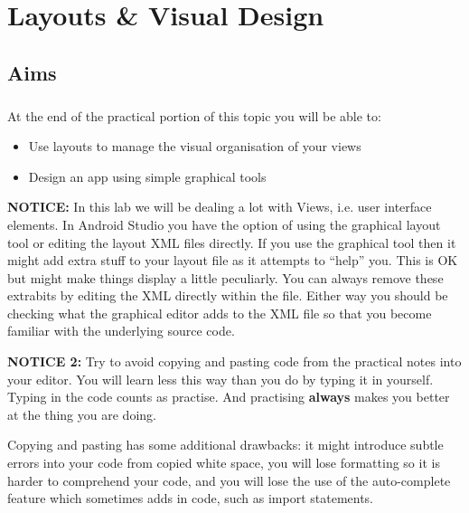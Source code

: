 \chapter{Layouts \& Visual Design}
\section{Aims}
\paragraph{} At the end of the practical portion of this topic you will be able to:

\begin{itemize}
\item Use layouts to manage the visual organisation of your views
\item Design an app using simple graphical tools
\end{itemize}


\begin{framed}
{\bf{NOTICE:}} In this lab we will be dealing a lot with Views, i.e. user interface elements. In Android Studio you have the option of using the graphical layout tool or editing the layout XML files directly. If you use the graphical tool then it might add extra stuff to your layout file as it attempts to ``help'' you. This is OK but might make things display a little peculiarly. You can always remove these extrabits by editing the XML directly within the file. Either way you should be checking what the graphical editor adds to the XML file so that you become familiar with the underlying source code.
\end{framed}

\begin{framed}
{\bf{NOTICE 2:}} Try to avoid copying and pasting code from the practical notes into your editor. You will learn less this way than you do by typing it in yourself. Typing in the code counts as practise. And practising {\bf{always}} makes you better at the thing you are doing.

Copying and pasting has some additional drawbacks: it might introduce subtle errors into your code from copied white space, you will lose formatting so it is harder to comprehend your code, and you will lose the use of the auto-complete feature which sometimes adds in code, such as import statements.
\end{framed}

